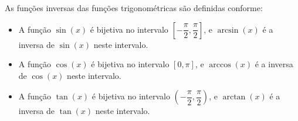As funções inversas das funções trigonométricas são definidas conforme:
\begin{itemize}
	\item A função $\sin(x)$ é bijetiva no intervalo $\left[-\dfrac{\pi}{2},\dfrac{\pi}{2}\right]$, e $\arcsin(x)$ é a inversa de $\sin(x)$ neste intervalo.
	\item A função $\cos(x)$ é bijetiva no intervalo $\left[0,\pi\right]$, e $\arccos(x)$ é a inversa de $\cos(x)$ neste intervalo.
	\item A função $\tan(x)$ é bijetiva no intervalo $\left(-\dfrac{\pi}{2},\dfrac{\pi}{2}\right)$, e $\arctan(x)$ é a inversa de $\tan(x)$ neste intervalo.
\end{itemize}
